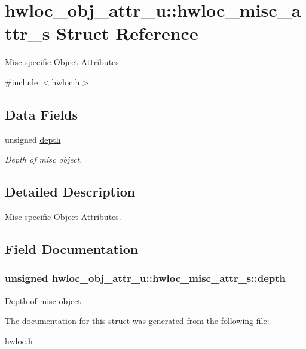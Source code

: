 \hypertarget{structhwloc__obj__attr__u_1_1hwloc__misc__attr__s}{
\section{hwloc\_\-obj\_\-attr\_\-u::hwloc\_\-misc\_\-attr\_\-s Struct Reference}
\label{structhwloc__obj__attr__u_1_1hwloc__misc__attr__s}
}


Misc-\/specific Object Attributes.  


{\ttfamily \#include $<$hwloc.h$>$}\subsection*{Data Fields}
\begin{DoxyCompactItemize}
\item 
unsigned \hyperlink{structhwloc__obj__attr__u_1_1hwloc__misc__attr__s_a67d34faf12434d9732754dcbfe58e4a9}{depth}
\begin{DoxyCompactList}\small\item\em Depth of misc object. \item\end{DoxyCompactList}\end{DoxyCompactItemize}


\subsection{Detailed Description}
Misc-\/specific Object Attributes. 

\subsection{Field Documentation}
\hypertarget{structhwloc__obj__attr__u_1_1hwloc__misc__attr__s_a67d34faf12434d9732754dcbfe58e4a9}{
\subsubsection[{depth}]{\setlength{\rightskip}{0pt plus 5cm}unsigned {\bf hwloc\_\-obj\_\-attr\_\-u::hwloc\_\-misc\_\-attr\_\-s::depth}}}
\label{structhwloc__obj__attr__u_1_1hwloc__misc__attr__s_a67d34faf12434d9732754dcbfe58e4a9}


Depth of misc object. 

The documentation for this struct was generated from the following file:\begin{DoxyCompactItemize}
\item 
hwloc.h\end{DoxyCompactItemize}
